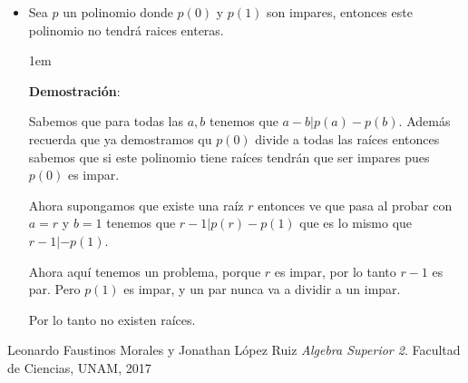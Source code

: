 \documentclass[12pt, fleqn]{report}                             %
\newenvironment{SmallIndentation}[1][0.75em]                    %
    {\begin{adjustwidth}{#1}{}\begin{footnotesize}}                 %
    {\end{footnotesize}\end{adjustwidth}}                           %
\begin{document}
\begin{itemize}
                \begin{SmallIndentation}[1em]
                    \textbf{Ideas}:
                    
                        Esto se deduce facilmente usando la idea de continuidad

                \end{SmallIndentation}
                    

            \item Sea $p$ un polinomio donde $p(0)$ y $p(1)$ son impares, entonces este polinomio
                no tendrá raices enteras.

                \begin{SmallIndentation}[1em]
                    \textbf{Demostración}:
                    
                    Sabemos que para todas las $a, b$ tenemos que $a - b | p(a) - p(b)$.
                    Además recuerda que ya demostramos qu $p(0)$ divide a todas las raíces entonces
                    sabemos que si este polinomio tiene raíces tendrán que ser impares pues $p(0)$ es impar.

                    Ahora supongamos que existe una raíz $r$ entonces ve que pasa al probar con $a=r$ y $b=1$
                    tenemos que $r-1 | p(r) - p(1)$ que es lo mismo que $r-1|-p(1)$.

                    Ahora aquí tenemos un problema, porque $r$ es impar, por lo tanto $r-1$ es par.
                    Pero $p(1)$ es impar, y un par nunca va a dividir a un impar.

                    Por lo tanto no existen raíces.

                \end{SmallIndentation}
                    
                    
        \end{itemize}



\begin{thebibliography}{10}

        Leonardo Faustinos Morales y Jonathan López Ruiz
        \textit{Algebra Superior 2}. 
        Facultad de Ciencias, UNAM, 2017

\end{thebibliography}
\end{document}
